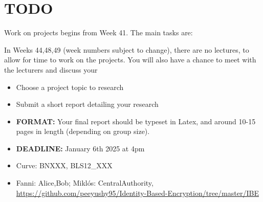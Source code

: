 \section{TODO}

Work on projects begins from Week 41. The main tasks are:

In Weeks 44,48,49 (week numbers subject to change), there are no lectures, to allow for time to work on the projects. You will also have a chance to meet with the lecturers and discuss your

\begin{itemize}
    \item Choose a project topic to research
    \item Submit a short report detailing your research
    \item \textbf{FORMAT:} Your final report should be typeset in Latex, and around 10-15 pages in length (depending on group size).
    \item \textbf{DEADLINE:} January 6th 2025 at 4pm %
\end{itemize}

\begin{itemize}
    \item Curve: BNXXX, BLS12\_XXX
    \item  Fanni: Alice,Bob; Miklós: CentralAuthority, \url{https://github.com/peeyushy95/Identity-Based-Encryption/tree/master/IBE}
\end{itemize}